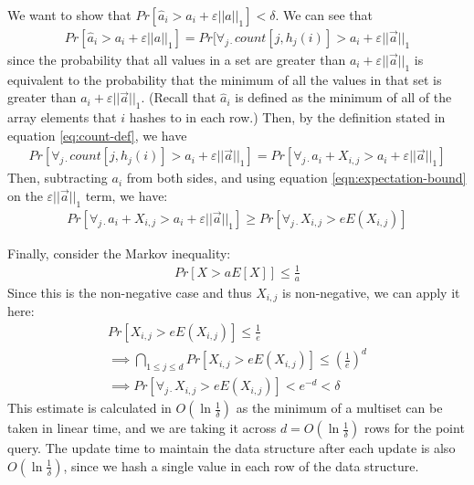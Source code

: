 \documentclass[11pt]{article}
\newcommand{\comment}[1]{}
\DeclarePairedDelimiter\ceil{\lceil}{\rceil}
\begin{document}
We want to show that $Pr[\hat{a}_i > a_i + \varepsilon ||a||_1] < \delta$. We can see that
\begin{align}
    Pr[\hat{a}_i > a_i + \varepsilon ||a||_1] = Pr[\forall_{j \cdot} count[j, h_j(i)] > a_i + \varepsilon ||\vec{a}||_1 
\end{align}
since the probability that all values in a set are greater than $a_i + \varepsilon||\vec a||_1$ is equivalent 
to the probability that the minimum of all the values in that set is greater than $a_i + \varepsilon||\vec a||_1$.
(Recall that $\hat a_i$ is defined as the minimum of all of the array elements that $i$
hashes to in each row.) Then, by the definition stated in equation \ref{eq:count-def}, we have
\begin{align}
    Pr[\forall_{j \cdot} count[j, h_j(i)] > a_i + \varepsilon ||\vec{a}||_1] = Pr[\forall_{j \cdot} a_i + X_{i, j} > a_i + \varepsilon ||\vec{a}||_1]
\end{align}
Then, subtracting $a_i$ from both sides, and using equation \ref{eqn:expectation-bound} on the $\varepsilon ||\vec{a}||_1$ term, we have:
\begin{align}
    Pr[\forall_{j \cdot} a_i + X_{i, j} > a_i + \varepsilon ||\vec{a}||_1] \geq Pr[\forall_{j \cdot} X_{i, j} > e E(X_{i, j})]
\end{align}

\pagebreak
Finally, consider the Markov inequality:
\begin{align}
    Pr[X > aE[X]] \leq \frac{1}{a}
\end{align}
Since this is the non-negative case and thus $X_{i, j}$ is non-negative, we can apply it here:
\begin{align}
    Pr[X_{i, j} > e E(X_{i, j})] \leq \frac{1}{e} \\
    \implies \bigcap_{1 \leq j \leq d} Pr[X_{i, j} > e E(X_{i, j})] \leq \left(\frac{1}{e}\right)^d \\
    \implies Pr[\forall_{j \cdot} X_{i, j} > e E(X_{i, j})] \comment{\leq \frac{E(X_{i, j})}{a_i + \varepsilon||a||_1} \leq \frac{\ceil{\frac{\varepsilon}{e}} ||\vec{a}||_1}{a_i + \varepsilon||a||_1}}
      < e^{-d} < \delta
\end{align}
This estimate is calculated in $O(\ln \frac{1}{\delta})$ as the minimum of a multiset can be taken in linear time, and we are taking it across $d = O(\ln \frac{1}{\delta})$ rows for the point query.  The update time to maintain the data structure after each update is also $O(\ln \frac{1}{\delta})$, since we hash a single value in each row of the data structure.
\end{document}
